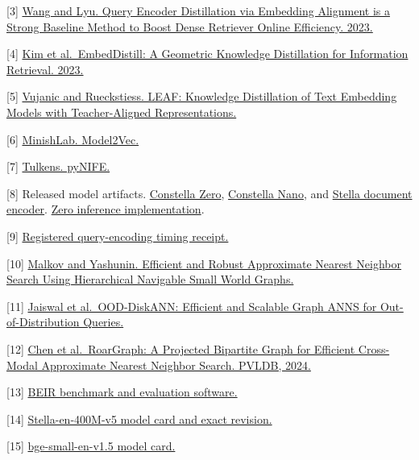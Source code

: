 \documentclass[
  english,
  10pt,
]{article}
\begin{document}
{[}3{]} \href{https://arxiv.org/abs/2306.11550}{Wang and Lyu. Query
Encoder Distillation via Embedding Alignment is a Strong Baseline Method
to Boost Dense Retriever Online Efficiency. 2023.}

{[}4{]} \href{https://arxiv.org/abs/2301.12005}{Kim et al.~EmbedDistill:
A Geometric Knowledge Distillation for Information Retrieval. 2023.}

{[}5{]} \href{https://arxiv.org/abs/2509.12539}{Vujanic and Rueckstiess.
LEAF: Knowledge Distillation of Text Embedding Models with
Teacher-Aligned Representations.}

{[}6{]} \href{https://github.com/MinishLab/model2vec}{MinishLab.
Model2Vec.}

{[}7{]} \href{https://github.com/stephantul/pynife}{Tulkens. pyNIFE.}

{[}8{]} Released model artifacts.
\href{https://huggingface.co/Qdrant/constella-zero}{Constella Zero},
\href{https://huggingface.co/Qdrant/constella-nano}{Constella Nano}, and
\href{https://huggingface.co/Qdrant/stella-en-400M-v5-doc-onnx}{Stella
document encoder}.
\href{https://github.com/Dylancouzon/asymmetric-dual-encoders/blob/540e2bb089a30c83225156945a76b1537beedcd3/m11/release/zero_encoder.py}{Zero
inference implementation}.

{[}9{]}
\href{https://github.com/Dylancouzon/asymmetric-dual-encoders/blob/540e2bb089a30c83225156945a76b1537beedcd3/results/m15_e1_latency.json}{Registered
query-encoding timing receipt.}

{[}10{]} \href{https://arxiv.org/abs/1603.09320}{Malkov and Yashunin.
Efficient and Robust Approximate Nearest Neighbor Search Using
Hierarchical Navigable Small World Graphs.}

{[}11{]} \href{https://arxiv.org/abs/2211.12850}{Jaiswal et
al.~OOD-DiskANN: Efficient and Scalable Graph ANNS for
Out-of-Distribution Queries.}

{[}12{]} \href{https://www.vldb.org/pvldb/vol17/p2735-chen.pdf}{Chen et
al.~RoarGraph: A Projected Bipartite Graph for Efficient Cross-Modal
Approximate Nearest Neighbor Search. PVLDB, 2024.}

{[}13{]} \href{https://github.com/beir-cellar/beir}{BEIR benchmark and
evaluation software.}

{[}14{]}
\href{https://huggingface.co/NovaSearch/stella_en_400M_v5/tree/ffeb2b7ee715c226d4ffe5e4619f7dbb48624c20}{Stella-en-400M-v5
model card and exact revision.}

{[}15{]}
\href{https://huggingface.co/BAAI/bge-small-en-v1.5}{bge-small-en-v1.5
model card.}
\end{document}
